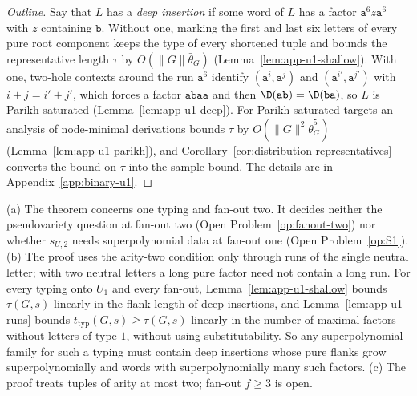 \begin{proof}[Outline]
Say that $L$ has a \emph{deep insertion} if some word of $L$ has a factor
$\mathtt a^6z\mathtt a^6$ with $z$ containing $\mathtt b$.  Without one, marking the
first and last six letters of every pure root component keeps the type of
every shortened tuple and bounds the representative length $\tau$ by
$O(\|G\|\bar\theta_G)$ (Lemma~\ref{lem:app-u1-shallow}).  With one, two-hole
contexts around the run $\mathtt a^6$ identify $(\mathtt a^i,\mathtt a^j)$ and
$(\mathtt a^{i'},\mathtt a^{j'})$ with $i+j=i'+j'$, which forces a factor
$\mathtt a\mathtt b\mathtt a\mathtt a$ and then $\D(\mathtt{ab})=\D(\mathtt{ba})$, so
$L$ is Parikh-saturated (Lemma~\ref{lem:app-u1-deep}).  For Parikh-saturated
targets an analysis of node-minimal derivations bounds $\tau$ by
$O(\|G\|^2\bar\theta_G^5)$ (Lemma~\ref{lem:app-u1-parikh}), and
Corollary~\ref{cor:distribution-representatives} converts the bound on $\tau$
into the sample bound.  The details are in Appendix~\ref{app:binary-u1}.
\end{proof}

\begin{remark}
\label{rem:binary-u1-scope}
(a) The theorem concerns one typing and fan-out two.  It decides neither the
pseudovariety question at fan-out two (Open Problem~\ref{op:fanout-two}) nor
whether $s_{U,2}$ needs superpolynomial data at fan-out one (Open
Problem~\ref{op:S1}).
(b) The proof uses the arity-two condition only through runs of the single
neutral letter; with two neutral letters a long pure factor need not contain a
long run.  For every typing onto $U_1$ and every fan-out,
Lemma~\ref{lem:app-u1-shallow} bounds $\tau(G,s)$ linearly in the flank length
of deep insertions, and Lemma~\ref{lem:app-u1-runs} bounds
$t_{\mathrm{typ}}(G,s)\ge\tau(G,s)$ linearly in the number of maximal
factors without letters of type $1$, without using substitutability.  So any
superpolynomial family for such a typing must contain deep insertions whose
pure flanks grow superpolynomially and words with superpolynomially many such
factors.
(c) The proof treats tuples of arity at most two; fan-out $f\ge3$ is open.
\end{remark}

